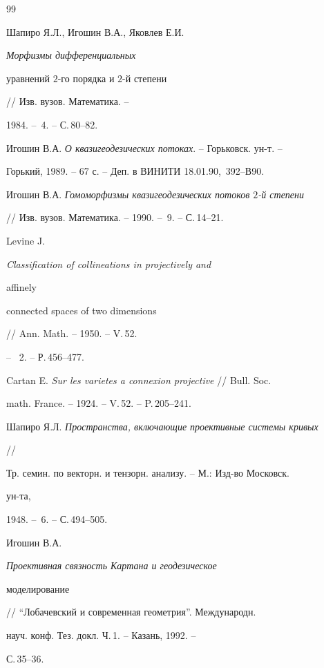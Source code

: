 \begin{thebibliography}{99}


Шапиро Я.Л., Игошин В.А., Яковлев Е.И. {\em Морфизмы дифференциальных 


уравнений $2$-го порядка и $2$-й степени} // Изв. вузов. Математика. -- 


1984. -- \No\,4. -- С.\,80--82. 




Игошин В.А. {\em О квазигеодезических потоках}. -- Горьковск. ун-т. -- 


Горький, 1989. -- 67 с. -- Деп. в ВИНИТИ 18.01.90, \No\,392--В90. 




Игошин В.А. {\em Гомоморфизмы квазигеодезических потоков $2$-й степени} 


// Изв. вузов. Математика. -- 1990. -- \No\,9. -- С.\,14--21.




Levine J. {\em Classification of collineations in projectively and 


affinely 


connected spaces of two dimensions} // Ann. Math. -- 1950. -- V.\,52. 


-- \No\, 2. -- Р.\,456--477. 




Cartan E. {\em Sur les varietes a connexion projective} // Bull. Soc. 


math. France. -- 1924. -- V.\,52. -- P.\,205--241. 




Шапиро Я.Л. {\em Пространства, включающие проективные системы кривых} 


// 


Тр. семин. по векторн. и тензорн. анализу. -- М.: Изд-во Московск. 


ун-та, 


1948. -- \No\,6. -- С.\,494--505. 




Игошин В.А. {\em Проективная связность Картана и геодезическое 


моделирование} 


// ``Лобачевский и современная геометрия''. Международн. 


науч. конф. Тез. докл. Ч.\,1. -- Казань, 1992. -- 


С.\,35--36. 





\end{thebibliography} 


